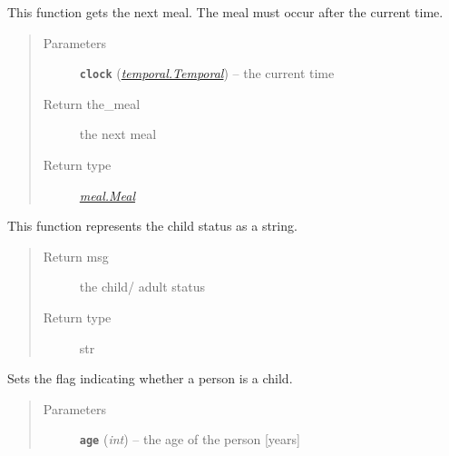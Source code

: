 \documentclass[letterpaper,10pt,english]{sphinxmanual}
\begin{document}
\begin{fulllineitems}
\begin{fulllineitems}
\end{fulllineitems}


\begin{fulllineitems}
\label{social:social.Social.get_next_meal}
This function gets the next meal. The meal must occur after the current time.
\begin{quote}\begin{description}
\item[{Parameters}] \leavevmode
\textbf{\texttt{clock}} ({\hyperref[temporal:temporal.Temporal]{\emph{\emph{temporal.Temporal}}}}) -- the current time

\item[{Return the\_meal}] \leavevmode
the next meal

\item[{Return type}] \leavevmode
{\hyperref[meal:meal.Meal]{\emph{meal.Meal}}}

\end{description}\end{quote}

\end{fulllineitems}


\begin{fulllineitems}
\label{social:social.Social.print_child_status}
This function represents the child status as a string.
\begin{quote}\begin{description}
\item[{Return msg}] \leavevmode
the child/ adult status

\item[{Return type}] \leavevmode
str

\end{description}\end{quote}

\end{fulllineitems}


\begin{fulllineitems}
\label{social:social.Social.set_child_flag}
Sets the flag indicating whether a person is a child.
\begin{quote}\begin{description}
\item[{Parameters}] \leavevmode
\textbf{\texttt{age}} (\emph{int}) -- the age of the person {[}years{]}


\end{description}
\end{quote}
\end{fulllineitems}
\end{fulllineitems}
\end{document}
